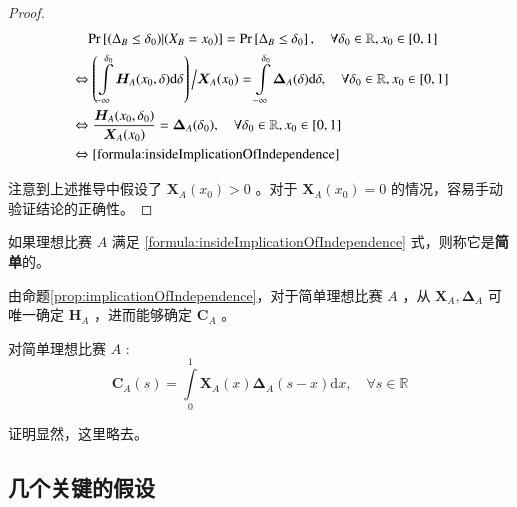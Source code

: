             \begin{proof}
                \begin{align*}
                    &\phantom{\Leftrightarrow\ }\mathrm{Pr}\left[(\Delta_B\leq\delta_0)|(X_B=x_0)\right]=\mathrm{Pr}\left[\Delta_B\leq\delta_0\right],\quad\forall \delta_0\in\mathbb{R},x_0\in\left[0,1\right] \\
                    &\Leftrightarrow \left(\displaystyle\int\limits_{-\infty}^{\delta_0} \bm{H}_A(x_0,\delta)\mathrm{d}\delta\right)\Big/{\bm{X}_A(x_0)}=\int\limits_{-\infty}^{\delta_0} \bm{\Delta}_A(\delta)\mathrm{d}\delta,\quad\forall \delta_0\in\mathbb{R},x_0\in\left[0,1\right] \\
                    &\Leftrightarrow \dfrac{\bm{H}_A(x_0,\delta_0)}{\bm{X}_A(x_0)}=\bm{\Delta}_A(\delta_0),\quad\forall \delta_0\in\mathbb{R},x_0\in\left[0,1\right] \\
                    &\Leftrightarrow \eqref{formula:insideImplicationOfIndependence}
                \end{align*}

                注意到上述推导中假设了 $\bm{X}_A(x_0)>0$ 。对于 $\bm{X}_A(x_0)=0$ 的情况，容易手动验证结论的正确性。

            \end{proof}

            \begin{definition}[简单理想比赛]
                如果理想比赛 $A$ 满足 \eqref{formula:insideImplicationOfIndependence} 式，则称它是\textbf{简单}的。

                \label{def:simplicityOfContest}
            \end{definition}

            由命题\ref{prop:implicationOfIndependence}，对于简单理想比赛 $A$ ，从 $\bm{X}_A,\bm{\Delta}_A$ 可唯一确定 $\bm{H}_A$ ，进而能够确定 $\bm{C}_A$ 。

            \begin{proposition}[简单理想比赛的分数分布函数]
                对简单理想比赛 $A$ :
                $$
                \bm{C}_A(s)=\int\limits_{0}^1 \bm{X}_A(x)\bm{\Delta}_A(s-x) \mathrm{d}x,\quad\forall s\in\mathbb{R}
                $$

                \label{def:scoreDistributionInSimpleContest}
            \end{proposition}

            证明显然，这里略去。

    \subsection{几个关键的假设}


